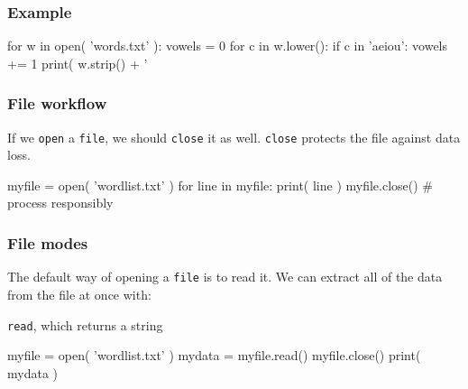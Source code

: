 \documentclass[11pt]{beamer}
\begin{document}
\begin{frame}[fragile]
  \frametitle{Example}
  \Enlarge

  \begin{semiverbatim}
for w in open( 'words.txt' ):
    vowels = 0
    for c in w.lower():
        if c in 'aeiou':
            vowels += 1
    print( w.strip() + ' %
  \end{semiverbatim}
\end{frame}

\begin{frame}[fragile]
  \frametitle{File workflow}
  \Enlarge

  \begin{itemize}
  \myitem  If we \texttt{open} a  \texttt{file}, we should \texttt{close} it as well.
  \myitem  \texttt{close} protects the file against data loss.
  \end{itemize}
  \begin{semiverbatim}
myfile = open( 'wordlist.txt' )
for line in myfile:
    print( line )
myfile.close()  # process responsibly
  \end{semiverbatim}
\end{frame}

\begin{frame}[fragile]
  \frametitle{File modes}
  \Enlarge

  \begin{itemize}
  \myitem  The default way of opening a \texttt{file} is to read it.
  \myitem  We can extract all of the data from the file at once with:
    \begin{itemize}
    \mysubitem  \texttt{read}, which returns a string
    \end{itemize}
  \end{itemize}
  \begin{semiverbatim}
myfile = open( 'wordlist.txt' )
mydata = myfile.read()
myfile.close()
print( mydata )
  \end{semiverbatim}
\end{frame}
\end{document}
